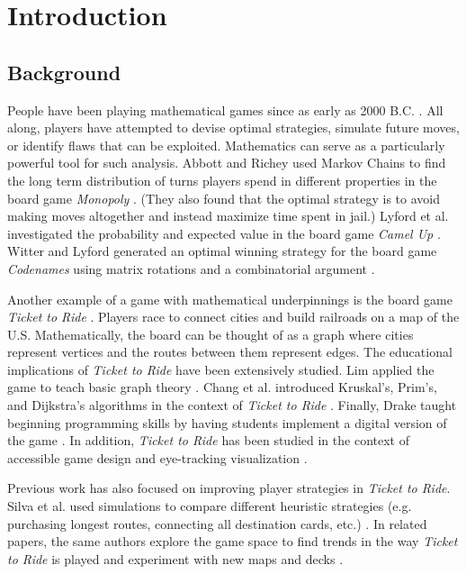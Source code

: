 \section{Introduction}
\subsection{Background}
People have been playing mathematical games
since as early as 2000 B.C.
\cite{cornelius1986historical}.
All along,
players have attempted to devise optimal
strategies, simulate future moves, or identify
flaws that can be exploited.
Mathematics can serve as a particularly powerful tool for
such analysis.
Abbott and Richey used Markov Chains
to find the long term 
distribution of turns players spend in different
properties in the board game
\textit{Monopoly} \cite{abbott1997take, magie1935}.
(They also found that the optimal strategy is to avoid making
moves altogether and instead maximize time spent in jail.)
Lyford et al. investigated the probability and expected value 
in the board game \textit{Camel Up}
\cite{bogen2014, lyford2019using}.
Witter and Lyford generated an optimal winning strategy for the 
board game \textit{Codenames} using matrix rotations
and a combinatorial argument \cite{chvatil2015}.

Another example of a game with mathematical underpinnings is
the board game \textit{Ticket to Ride} \cite{moon2004ticket}. 
Players race to connect 
cities and build railroads on a map of the U.S.
Mathematically, the board
can be thought of as a graph where
cities represent vertices and the
routes between them represent edges.
The educational implications of \textit{Ticket to Ride}
have been extensively studied.
Lim applied the game to teach basic graph theory
\cite{lim2007taking}.
Chang et al. introduced Kruskal's, Prim's, and Dijkstra's
algorithms in the context of \textit{Ticket to Ride}
\cite{chang2008learning}.
Finally, Drake taught beginning programming skills by having
students implement a digital version of the game \cite{drake2011teaching}.
In addition, \textit{Ticket to Ride} has been studied in the context of
accessible game design and eye-tracking visualization
\cite{eriksson2005enhancing, newn2017evaluating}.

Previous work has also focused on improving player 
strategies in \textit{Ticket to Ride}.
Silva et al. used simulations to compare different
heuristic strategies (e.g. purchasing longest routes,
connecting all destination cards, etc.) \cite{de2017playtesting}.
In related papers, the same authors explore the 
game space to find trends in the way \textit{Ticket to Ride}
is played and experiment with new maps and decks 
\cite{de2017evaluator, de2018evolving}.

